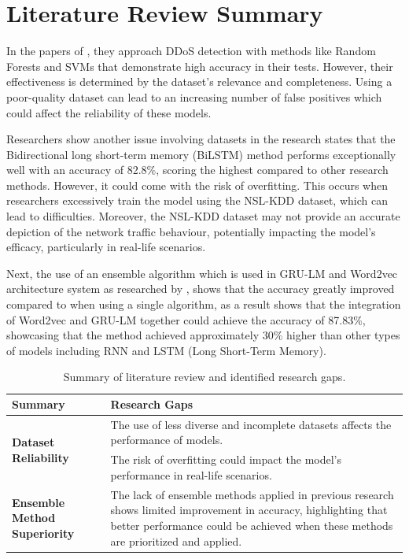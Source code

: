 \documentclass[a4paper, 12pt]{article}
\begin{document}
\clearpage

\section{Literature Review Summary}

In the papers of , they approach DDoS detection with methods like Random Forests and SVMs that demonstrate high accuracy in their tests. However, their effectiveness is determined by the dataset's relevance and completeness. Using a poor-quality dataset can lead to an increasing number of false positives which could affect the reliability of these models.

Researchers show another issue involving datasets in the research  states that the Bidirectional long short-term memory (BiLSTM) method performs exceptionally well with an accuracy of 82.8\%, scoring the highest compared to other research methods. However, it could come with the risk of overfitting. This occurs when researchers excessively train the model using the NSL-KDD dataset, which can lead to difficulties. Moreover, the NSL-KDD dataset may not provide an accurate depiction of the network traffic behaviour, potentially impacting the model’s efficacy, particularly in real-life scenarios.

 Next, the use of an ensemble algorithm which is used in GRU-LM  and Word2vec architecture system as researched by , shows that the accuracy greatly improved compared to when using a single algorithm, as a result shows that the integration of Word2vec and GRU-LM together could achieve the accuracy of 87.83\%, showcasing that the method achieved approximately 30\% higher than other types of models including RNN and LSTM (Long Short-Term Memory). 

\begin{table}[!ht]
    \centering
    \begin{tabular}{|p{5cm}|p{10cm}|}
    \hline
        \textbf{Summary} & \textbf{Research Gaps} \\ \hline
        \multirow{2}{5cm}{\textbf{Dataset Reliability}} & The use of less diverse and incomplete datasets affects the performance of models. \\ \cline{2-2}
        & The risk of overfitting could impact the model's performance in real-life scenarios. \\ \hline
        \textbf{Ensemble Method Superiority} & The lack of ensemble methods applied in previous research shows limited improvement in accuracy, highlighting that better performance could be achieved when these methods are prioritized and applied. \\ \hline
    \end{tabular}
    \caption{Summary of literature review and identified research gaps.}
    \label{table:1}
\end{table}
\end{document}
